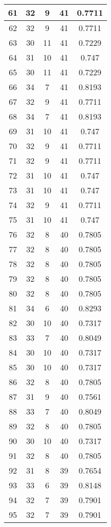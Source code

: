 \documentclass[letterpaper, 12pt]{article}
\begin{document}
\begin{longtable}{|c|c|c|c|c|}
\hline
61 & 32 & 9 & 41 & 0.7711 \\
\hline
62 & 32 & 9 & 41 & 0.7711 \\
\hline
63 & 30 & 11 & 41 & 0.7229 \\
\hline
64 & 31 & 10 & 41 & 0.747 \\
\hline
65 & 30 & 11 & 41 & 0.7229 \\
\hline
66 & 34 & 7 & 41 & 0.8193 \\
\hline
67 & 32 & 9 & 41 & 0.7711 \\
\hline
68 & 34 & 7 & 41 & 0.8193 \\
\hline
69 & 31 & 10 & 41 & 0.747 \\
\hline
70 & 32 & 9 & 41 & 0.7711 \\
\hline
71 & 32 & 9 & 41 & 0.7711 \\
\hline
72 & 31 & 10 & 41 & 0.747 \\
\hline
73 & 31 & 10 & 41 & 0.747 \\
\hline
74 & 32 & 9 & 41 & 0.7711 \\
\hline
75 & 31 & 10 & 41 & 0.747 \\
\hline
76 & 32 & 8 & 40 & 0.7805 \\
\hline
77 & 32 & 8 & 40 & 0.7805 \\
\hline
78 & 32 & 8 & 40 & 0.7805 \\
\hline
79 & 32 & 8 & 40 & 0.7805 \\
\hline
80 & 32 & 8 & 40 & 0.7805 \\
\hline
81 & 34 & 6 & 40 & 0.8293 \\
\hline
82 & 30 & 10 & 40 & 0.7317 \\
\hline
83 & 33 & 7 & 40 & 0.8049 \\
\hline
84 & 30 & 10 & 40 & 0.7317 \\
\hline
85 & 30 & 10 & 40 & 0.7317 \\
\hline
86 & 32 & 8 & 40 & 0.7805 \\
\hline
87 & 31 & 9 & 40 & 0.7561 \\
\hline
88 & 33 & 7 & 40 & 0.8049 \\
\hline
89 & 32 & 8 & 40 & 0.7805 \\
\hline
90 & 30 & 10 & 40 & 0.7317 \\
\hline
91 & 32 & 8 & 40 & 0.7805 \\
\hline
92 & 31 & 8 & 39 & 0.7654 \\
\hline
93 & 33 & 6 & 39 & 0.8148 \\
\hline
94 & 32 & 7 & 39 & 0.7901 \\
\hline
95 & 32 & 7 & 39 & 0.7901 \\

\end{longtable}
\end{document}
